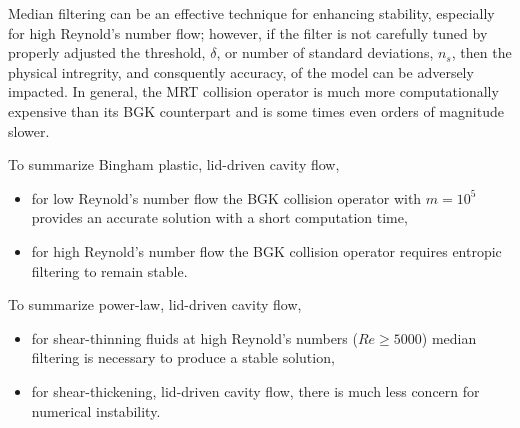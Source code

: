 Median filtering can be an effective technique for enhancing stability, especially for high Reynold's number flow; however, if the filter is not carefully tuned by properly adjusted the threshold, $\delta$, or number of standard deviations, $n_s$, then the physical intregrity, and consquently accuracy, of the model can be adversely impacted.
In general, the MRT collision operator is much more computationally expensive than its BGK counterpart and is some times even orders of magnitude slower.

To summarize Bingham plastic, lid-driven cavity flow,
    \begin{itemize}
  \item for low Reynold's number flow the BGK collision operator with $m = 10^5$ provides an accurate solution with a short computation time,
    \item for high Reynold's number flow the BGK collision operator requires entropic filtering to remain stable.
    \end{itemize}
To summarize power-law, lid-driven cavity flow,
    \begin{itemize}
      \item for shear-thinning fluids at high Reynold's numbers ($Re \ge 5000$) median filtering is necessary to produce a stable solution,
  \item for shear-thickening, lid-driven cavity flow, there is much less concern for numerical instability.
    \end{itemize}


